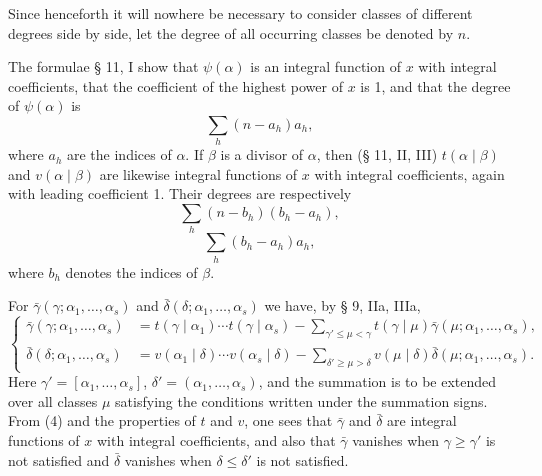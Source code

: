 \documentclass[11pt,a4paper]{article}
\begin{document}
Since henceforth it will nowhere be necessary to consider classes of different degrees side by side, let the degree of all occurring classes be denoted by $n$.

The formulae § 11, I show that $\psi(\alpha)$ is an integral function of $x$ with integral coefficients, that the coefficient of the highest power of $x$ is 1, and that the degree of $\psi(\alpha)$ is
\begin{equation}
 \sum_h(n-a_h)a_h,
\tag{1}
\end{equation}
where $a_h$ are the indices of $\alpha$. If $\beta$ is a divisor of $\alpha$, then (§ 11, II, III) $t(\alpha\mid\beta)$ and $v(\alpha\mid\beta)$ are likewise integral functions of $x$ with integral coefficients, again with leading coefficient 1. Their degrees are respectively
\begin{equation}
 \sum_h(n-b_h)(b_h-a_h),
\tag{2}
\end{equation}
\begin{equation}
 \sum_h(b_h-a_h)a_h,
\tag{3}
\end{equation}
where $b_h$ denotes the indices of $\beta$.

For $\bar\gamma(\gamma;\alpha_1,\ldots,\alpha_s)$ and $\bar\delta(\delta;\alpha_1,\ldots,\alpha_s)$ we have, by § 9, IIa, IIIa,
\begin{equation}
\left\{
\begin{aligned}
 \bar\gamma(\gamma;\alpha_1,\ldots,\alpha_s)
 &=t(\gamma\mid\alpha_1)\cdots t(\gamma\mid\alpha_s)
 -\sum_{\gamma'\le\mu<\gamma}t(\gamma\mid\mu)\bar\gamma(\mu;\alpha_1,\ldots,\alpha_s),\\
 \bar\delta(\delta;\alpha_1,\ldots,\alpha_s)
 &=v(\alpha_1\mid\delta)\cdots v(\alpha_s\mid\delta)
 -\sum_{\delta'\ge\mu>\delta}v(\mu\mid\delta)\bar\delta(\mu;\alpha_1,\ldots,\alpha_s).
\end{aligned}
\right.
\tag{4}
\end{equation}
Here $\gamma'=[\alpha_1,\ldots,\alpha_s]$, $\delta'=(\alpha_1,\ldots,\alpha_s)$, and the summation is to be extended over all classes $\mu$ satisfying the conditions written under the summation signs. From (4) and the properties of $t$ and $v$, one sees that $\bar\gamma$ and $\bar\delta$ are integral functions of $x$ with integral coefficients, and also that $\bar\gamma$ vanishes when $\gamma\ge\gamma'$ is not satisfied and $\bar\delta$ vanishes when $\delta\le\delta'$ is not satisfied.
\end{document}
